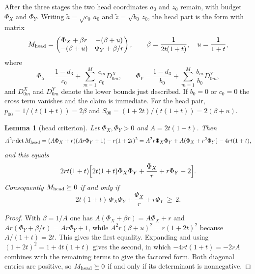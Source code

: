 \documentclass[10pt]{article}
\newtheorem{lemma}[theorem]{Lemma}
\theoremstyle{remark}
\newcommand{\dthree}{d_{3}}
\begin{document}
After the three stages the two head coordinates $a_0$ and $z_0$ remain, with budget $\Phi_X$ and $\Phi_Y$. Writing $\tilde a=\sqrt{c_0}\,a_0$ and $\tilde z=\sqrt{b_0}\,z_0$, the head part is the form with matrix
\[
M_{\rm head}=\begin{pmatrix}\Phi_X+\beta r&-(\beta+u)\\-(\beta+u)&\Phi_Y+\beta/r\end{pmatrix},
\qquad \beta=\frac1{2t(1+t)},\quad u=\frac1{1+t},
\]
where
\[
\Phi_X=\frac{1-\dthree}{c_0}+\sum_{m=1}^{M}\frac{c_m}{c_0}D^{X}_{0m},\qquad
\Phi_Y=\frac{1-\dthree}{b_0}+\sum_{m=1}^{M}\frac{b_m}{b_0}D^{Y}_{0m},
\]
and $D^{X}_{0m}$ and $D^{Y}_{0m}$ denote the lower bounds just described. If $b_0=0$ or $c_0=0$ the cross term vanishes and the claim is immediate. For the head pair, $p_{00}=1/(t(1+t))=2\beta$ and $S_{00}=(1+2t)/(t(1+t))=2(\beta+u)$.

\begin{lemma}[head criterion]\label{lem:head}
Let $\Phi_X,\Phi_Y>0$ and $A=2t(1+t)$. Then
\[
A^2r\det M_{\rm head}=(A\Phi_X+r)(Ar\Phi_Y+1)-r(1+2t)^2=A^2r\Phi_X\Phi_Y+A(\Phi_X+r^2\Phi_Y)-4rt(1+t),
\]
and this equals
\[
2rt(1+t)\Bigl[2t(1+t)\Phi_X\Phi_Y+\frac{\Phi_X}{r}+r\Phi_Y-2\Bigr].
\]
Consequently $M_{\rm head}\succeq0$ if and only if
\begin{equation}\label{eq:det}
2t(1+t)\,\Phi_X\Phi_Y+\frac{\Phi_X}{r}+r\Phi_Y\ \ge\ 2 .
\end{equation}
\end{lemma}

\begin{proof}
With $\beta=1/A$ one has $A(\Phi_X+\beta r)=A\Phi_X+r$ and $Ar(\Phi_Y+\beta/r)=Ar\Phi_Y+1$, while $A^2r(\beta+u)^2=r(1+2t)^2$ because $A/(1+t)=2t$. This gives the first equality. Expanding and using $(1+2t)^2=1+4t(1+t)$ gives the second, in which $-4rt(1+t)=-2rA$ combines with the remaining terms to give the factored form. Both diagonal entries are positive, so $M_{\rm head}\succeq0$ if and only if its determinant is nonnegative.
\end{proof}
\end{document}
